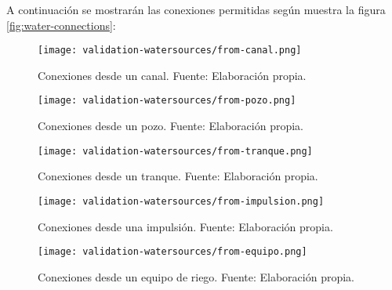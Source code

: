 A continuación se mostrarán las conexiones permitidas según muestra la figura \ref{fig:water-connections}:

\begin{figure}[H]
	\centering
	\texttt{[image: validation-watersources/from-canal.png]}
	\caption{\label{fig:from-canal} Conexiones desde un canal. Fuente: Elaboración propia.}
\end{figure}

\begin{figure}[H]
	\centering
	\texttt{[image: validation-watersources/from-pozo.png]}
	\caption{\label{fig:from-pozo} Conexiones desde un pozo. Fuente: Elaboración propia.}
\end{figure}

\begin{figure}[H]
	\centering
	\texttt{[image: validation-watersources/from-tranque.png]}
	\caption{\label{fig:from-tranque} Conexiones desde un tranque. Fuente: Elaboración propia.}
\end{figure}

\begin{figure}[H]
	\centering
	\texttt{[image: validation-watersources/from-impulsion.png]}
	\caption{\label{fig:from-impulsion} Conexiones desde una impulsión. Fuente: Elaboración propia.}
\end{figure}

\begin{figure}[H]
	\centering
	\texttt{[image: validation-watersources/from-equipo.png]}
	\caption{\label{fig:from-equipo} Conexiones desde un equipo de riego. Fuente: Elaboración propia.}
\end{figure}
\fi